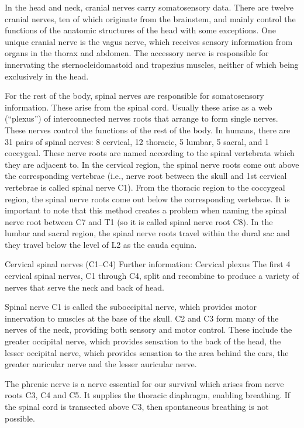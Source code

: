 In the head and neck, cranial nerves carry somatosensory data. There are twelve cranial nerves, ten of which originate from the brainstem, and mainly control the functions of the anatomic structures of the head with some exceptions. One unique cranial nerve is the vagus nerve, which receives sensory information from organs in the thorax and abdomen. The accessory nerve is responsible for innervating the sternocleidomastoid and trapezius muscles, neither of which being exclusively in the head.

For the rest of the body, spinal nerves are responsible for somatosensory information. These arise from the spinal cord. Usually these arise as a web (``plexus'') of interconnected nerves roots that arrange to form single nerves. These nerves control the functions of the rest of the body. In humans, there are 31 pairs of spinal nerves: 8 cervical, 12 thoracic, 5 lumbar, 5 sacral, and 1 coccygeal. These nerve roots are named according to the spinal vertebrata which they are adjacent to. In the cervical region, the spinal nerve roots come out above the corresponding vertebrae (i.e., nerve root between the skull and 1st cervical vertebrae is called spinal nerve C1). From the thoracic region to the coccygeal region, the spinal nerve roots come out below the corresponding vertebrae. It is important to note that this method creates a problem when naming the spinal nerve root between C7 and T1 (so it is called spinal nerve root C8). In the lumbar and sacral region, the spinal nerve roots travel within the dural sac and they travel below the level of L2 as the cauda equina.

Cervical spinal nerves (C1--C4)
Further information: Cervical plexus
The first 4 cervical spinal nerves, C1 through C4, split and recombine to produce a variety of nerves that serve the neck and back of head.

Spinal nerve C1 is called the suboccipital nerve, which provides motor innervation to muscles at the base of the skull. C2 and C3 form many of the nerves of the neck, providing both sensory and motor control. These include the greater occipital nerve, which provides sensation to the back of the head, the lesser occipital nerve, which provides sensation to the area behind the ears, the greater auricular nerve and the lesser auricular nerve.

The phrenic nerve is a nerve essential for our survival which arises from nerve roots C3, C4 and C5. It supplies the thoracic diaphragm, enabling breathing. If the spinal cord is transected above C3, then spontaneous breathing is not possible.

